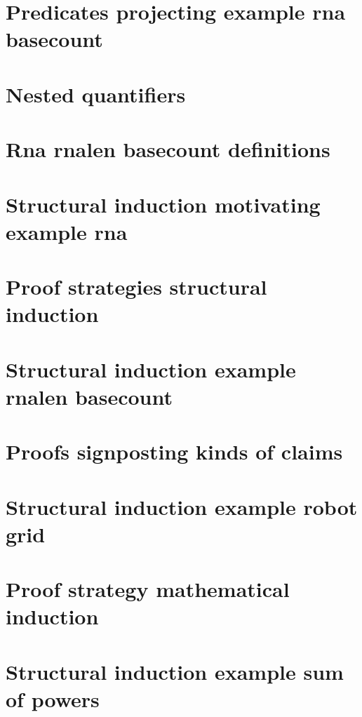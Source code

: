 \section*{Predicates projecting example rna basecount}

\vfill
\section*{Nested quantifiers}

\vfill
\section*{Rna rnalen basecount definitions}

\vfill
\section*{Structural induction motivating example rna}

\vfill
\section*{Proof strategies structural induction}

\vfill
\section*{Structural induction example rnalen basecount}

\vfill
\section*{Proofs signposting kinds of claims}

\vfill
\section*{Structural induction example robot grid}

\vfill
\section*{Proof strategy mathematical induction}

\vfill
\section*{Structural induction example sum of powers}

\vfill
